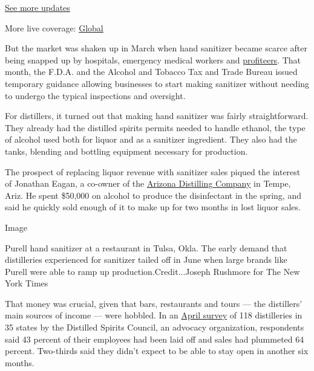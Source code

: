 \href{https://www.nytimes.com/live/2020/08/04/business/stock-market-today-coronavirus?action=click\&pgtype=Article\&state=default\&region=MAIN_CONTENT_1\&context=storylines_live_updates}{See
more updates}

More live coverage:
\href{https://www.nytimes.com/2020/08/04/world/coronavirus-cases.html?action=click\&pgtype=Article\&state=default\&region=MAIN_CONTENT_1\&context=storylines_live_updates}{Global}

But the market was shaken up in March when hand sanitizer became scarce
after being snapped up by hospitals, emergency medical workers and
\href{https://www.nytimes.com/2020/03/14/technology/coronavirus-purell-wipes-amazon-sellers.html}{profiteers}.
That month, the F.D.A. and the Alcohol and Tobacco Tax and Trade Bureau
issued temporary guidance allowing businesses to start making sanitizer
without needing to undergo the typical inspections and oversight.

For distillers, it turned out that making hand sanitizer was fairly
straightforward. They already had the distilled spirits permits needed
to handle ethanol, the type of alcohol used both for liquor and as a
sanitizer ingredient. They also had the tanks, blending and bottling
equipment necessary for production.

The prospect of replacing liquor revenue with sanitizer sales piqued the
interest of Jonathan Eagan, a co-owner of the
\href{https://azdistilling.com/}{Arizona Distilling Company} in Tempe,
Ariz. He spent \$50,000 on alcohol to produce the disinfectant in the
spring, and said he quickly sold enough of it to make up for two months
in lost liquor sales.

Image

Purell hand sanitizer at a restaurant in Tulsa, Okla. The early demand
that distilleries experienced for sanitizer tailed off in June when
large brands like Purell were able to ramp up production.Credit...Joseph
Rushmore for The New York Times

That money was crucial, given that bars, restaurants and tours --- the
distillers' main sources of income --- were hobbled. In an
\href{https://www.distilledspirits.org/news/new-survey-shows-covid-19-creating-severe-financial-hardships-for-craft-distillers/}{April
survey} of 118 distilleries in 35 states by the Distilled Spirits
Council, an advocacy organization, respondents said 43 percent of their
employees had been laid off and sales had plummeted 64 percent.
Two-thirds said they didn't expect to be able to stay open in another
six months.

